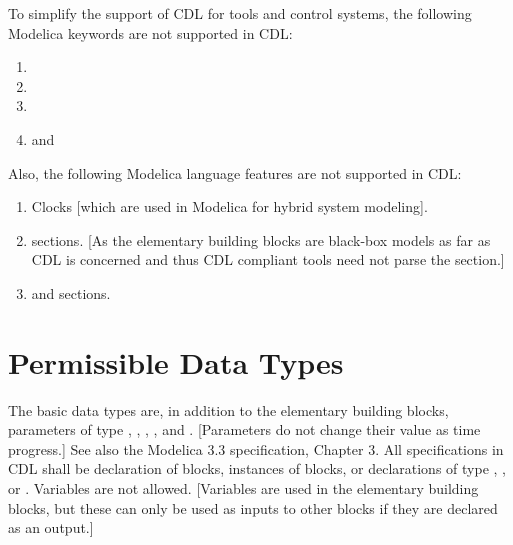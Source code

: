 \documentclass[letterpaper,10pt, openany,english]{sphinxmanual}
\begin{document}
To simplify the support of CDL for tools and control systems,
the following Modelica keywords are not supported in CDL:
\begin{enumerate}
\def\theenumi{\arabic{enumi}}
\def\labelenumi{\theenumi .}
\makeatletter\def\p@enumii{\p@enumi \theenumi .}\makeatother
\item {} 

\item {} 

\item {} 

\item {} 
 and 

\end{enumerate}

Also, the following Modelica language features are not supported in CDL:
\begin{enumerate}
\def\theenumi{\arabic{enumi}}
\def\labelenumi{\theenumi .}
\makeatletter\def\p@enumii{\p@enumi \theenumi .}\makeatother
\item {} 
Clocks {[}which are used in Modelica for hybrid system modeling{]}.

\item {} 
 sections. {[}As the elementary building blocks are black-box
models as far as CDL is concerned and thus CDL compliant tools need
not parse the  section.{]}

\item {} 
 and  sections.

\end{enumerate}


\section{Permissible Data Types}
\label{\detokenize{cdl:permissible-data-types}}\label{\detokenize{cdl:sec-cld-per-typ}}
The basic data types are, in addition to the elementary building blocks,
parameters of type
, , , , and .
{[}Parameters do not change their value as time progress.{]}
See also the Modelica 3.3 specification, Chapter 3.
All specifications in CDL shall be declaration of blocks,
instances of blocks, or declarations of type ,
, or .
Variables are not allowed.
{[}Variables are used in the elementary building blocks,
but these can only be used as inputs to other blocks if they are declared
as an output.{]}
\end{document}
